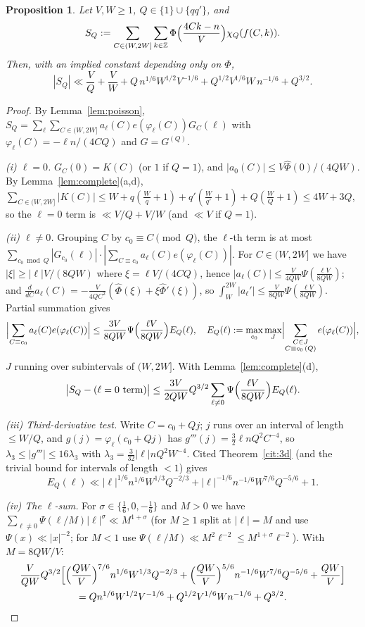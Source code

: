 \documentclass[11pt,reqno]{amsart}
\newtheorem{proposition}[theorem]{Proposition}
\theoremstyle{definition}
\newcommand{\Z}{\mathbb Z}
\begin{document}
\begin{proposition}\label{prop:strip}
Let $V,W\ge1$, $Q\in\{1\}\cup\{qq'\}$, and
\[
 S_Q:=\sum_{C\in(W,2W]}\sum_{k\in\Z}\Phi\Bigl(\frac{4Ck-n}{V}\Bigr)\chi_Q(f(C,k)).
\]
Then, with an implied constant depending only on $\Phi$,
\begin{equation}\label{eq:strip}
 |S_Q|\ll\frac VQ+\frac VW+Q\,n^{1/6}W^{1/2}V^{-1/6}
 +Q^{1/2}V^{1/6}W\,n^{-1/6}+Q^{3/2}.
\end{equation}
\end{proposition}
\begin{proof}
By Lemma~\ref{lem:poisson},
$S_Q=\sum_\ell\sum_{C\in(W,2W]}a_\ell(C)e(\varphi_\ell(C))G_C(\ell)$
with $\varphi_\ell(C)=-\ell n/(4CQ)$ and $G=G^{(Q)}$.

\emph{(i) $\ell=0$.}  $G_C(0)=K(C)$ (or $1$ if $Q=1$), and
$|a_0(C)|\le V\hat\Phi(0)/(4QW)$.  By Lemma~\ref{lem:complete}(a,d),
$\sum_{C\in(W,2W]}|K(C)|\le W+q(\frac Wq+1)+q'(\frac W{q'}+1)+Q(\frac
WQ+1)\le4W+3Q$, so the $\ell=0$ term is $\ll V/Q+V/W$ (and $\ll V$ if
$Q=1$).

\emph{(ii) $\ell\ne0$.}  Grouping $C$ by $c_0\equiv C\pmod Q$, the
$\ell$-th term is at most
$\sum_{c_0\bmod Q}|G_{c_0}(\ell)|\cdot|\sum_{C\equiv c_0}a_\ell(C)e(\varphi_\ell(C))|$.
For $C\in(W,2W]$ we have $|\xi|\ge|\ell|V/(8QW)$ where
$\xi=\ell V/(4CQ)$, hence $|a_\ell(C)|\le\frac V{4QW}\Psi(\frac{\ell
V}{8QW})$; and
$\frac{d}{dC}a_\ell(C)=-\frac V{4QC^2}(\hat\Phi(\xi)+\xi\hat\Phi'(\xi))$,
so $\int_W^{2W}|a_\ell'|\le\frac V{8QW}\Psi(\frac{\ell V}{8QW})$.  Partial
summation gives
\[
 \Bigl|\sum_{C\equiv c_0}a_\ell(C)e(\varphi_\ell(C))\Bigr|\le\frac{3V}{8QW}
 \Psi\Bigl(\frac{\ell V}{8QW}\Bigr)E_Q(\ell),\quad
 E_Q(\ell):=\max_{c_0}\max_{J}\Bigl|\sum_{\substack{C\in J\\ C\equiv
 c_0\,(Q)}}e(\varphi_\ell(C))\Bigr|,
\]
$J$ running over subintervals of $(W,2W]$.  With
Lemma~\ref{lem:complete}(d),
\[
 \bigl|S_Q-(\ell=0\ \text{term})\bigr|\le\frac{3V}{2QW}Q^{3/2}
 \sum_{\ell\ne0}\Psi\Bigl(\frac{\ell V}{8QW}\Bigr)E_Q(\ell).
\]

\emph{(iii) Third-derivative test.}  Write $C=c_0+Qj$; $j$ runs over an
interval of length $\le W/Q$, and $g(j)=\varphi_\ell(c_0+Qj)$ has
$g'''(j)=\frac32\ell nQ^2C^{-4}$, so $\lambda_3\le|g'''|\le16\lambda_3$
with $\lambda_3=\frac3{32}|\ell|nQ^2W^{-4}$.  Cited
Theorem~\ref{cit:3d} (and the trivial bound for intervals of length
$<1$) gives
\[
 E_Q(\ell)\ll|\ell|^{1/6}n^{1/6}W^{1/3}Q^{-2/3}
 +|\ell|^{-1/6}n^{-1/6}W^{7/6}Q^{-5/6}+1 .
\]

\emph{(iv) The $\ell$-sum.}  For $\sigma\in\{\frac16,0,-\frac16\}$ and
$M>0$ we have $\sum_{\ell\ne0}\Psi(\ell/M)|\ell|^\sigma\ll M^{1+\sigma}$
(for $M\ge1$ split at $|\ell|=M$ and use $\Psi(x)\ll|x|^{-2}$; for $M<1$
use $\Psi(\ell/M)\ll M^2\ell^{-2}\le M^{1+\sigma}\ell^{-2}$).  With
$M=8QW/V$:
\begin{multline*}
 \frac{V}{QW}Q^{3/2}\Bigl[\Bigl(\frac{QW}V\Bigr)^{7/6}n^{1/6}W^{1/3}Q^{-2/3}
 +\Bigl(\frac{QW}V\Bigr)^{5/6}n^{-1/6}W^{7/6}Q^{-5/6}+\frac{QW}V\Bigr]\\
 =Qn^{1/6}W^{1/2}V^{-1/6}+Q^{1/2}V^{1/6}Wn^{-1/6}+Q^{3/2}.\qedhere
\end{multline*}
\end{proof}
\end{document}
